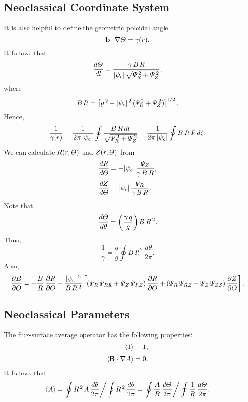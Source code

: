\documentclass[12pt]{article}
\begin{document}
\subsection{Neoclassical Coordinate System}
It is also helpful to define the geometric poloidal angle
\begin{equation}
{\bf b}\cdot\nabla {\mit\Theta} = \gamma(r).
\end{equation}
It follows that
\begin{equation}
\frac{d{\mit\Theta}}{dl} = \frac{\gamma\,B\,R}{|\psi_c|\,\sqrt{{\mit\Psi}_R^{\,2}+{\mit\Psi}_Z^{\,2}}},
\end{equation}
where
\begin{equation}
B\,R = \left[g^{\,2} + |\psi_c|^{\,2}\,({\mit\Psi}_R^{\,2}+{\mit\Psi}_Z^{\,2})\right]^{1/2}.
\end{equation}
Hence,
\begin{equation}
\frac{1}{\gamma(r)} = \frac{1}{2\pi\,|\psi_c|}\oint\frac{B\,R\,dl}{\sqrt{{\mit\Psi}_R^{\,2}+{\mit\Psi}_Z^{\,2}}}= \frac{1}{2\pi\,|\psi_c|}\oint B\,R\,F\,d\zeta.
\end{equation}
We can calculate $R(r,{\mit\Theta})$ and $Z(r,{\mit\Theta})$ from 
\begin{align}
\frac{dR}{d{\mit\Theta}} &=-|\psi_c|\,\frac{{\mit\Psi}_Z}{\gamma\,B\,R},\\[0.5ex]
\frac{dZ}{d{\mit\Theta}} &=|\psi_c|\,\frac{{\mit\Psi}_R}{\gamma\,B\,R}.
\end{align}
Note that
\begin{equation}
\frac{d{\mit\Theta}}{d\theta} = \left(\frac{\gamma\,q}{g}\right)B\,R^{\,2}.
\end{equation}
Thus,
\begin{equation}
\frac{1}{\gamma} = \frac{q}{g}\oint B\,R^{\,2}\,\frac{d\theta}{2\pi}.
\end{equation}
Also,
\begin{equation}
\frac{\partial B}{\partial{\mit\Theta}} = - \frac{B}{R}\,\frac{\partial R}{\partial{\mit\Theta}} + \frac{|\psi_c|^{\,2}}{B\,R^{\,2}}
\left[({\mit\Psi}_R\,{\mit\Psi}_{RR}+{\mit\Psi}_Z\,{\mit\Psi}_{RZ})\,\frac{\partial R}{\partial{\mit\Theta}}
+({\mit\Psi}_R\,{\mit\Psi}_{RZ}+{\mit\Psi}_Z\,{\mit\Psi}_{ZZ})\,\frac{\partial Z}{\partial{\mit\Theta}}\right].
\end{equation}

\subsection{Neoclassical Parameters}
The flux-surface average operator has the following
properties:
\begin{align}
\langle 1\rangle &= 1,\\[0.5ex]
\langle {\bf B}\cdot\nabla A\rangle &= 0.
\end{align}
It follows that
\begin{equation}\label{e140}
\langle A\rangle =\left.\oint R^{\,2}\,A\,\frac{d\theta}{2\pi}\right/\oint R^{\,2}\,\frac{d\theta}{2\pi}=\left.\oint
\frac{A}{B}\,\frac{d{\mit\Theta}}{2\pi}\right/\oint
\frac{1}{B}\,\frac{d{\mit\Theta}}{2\pi}.
\end{equation}
\end{document}
